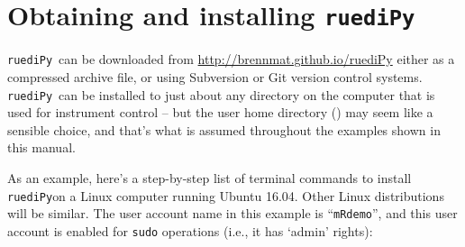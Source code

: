 \documentclass[12pt]{article}   	%
\newcommand{\ruediPy}{\texttt{ruediPy}}
\begin{document}
\section{Obtaining and installing \ruediPy}
\ruediPy\ can be downloaded from \url{http://brennmat.github.io/ruediPy} either as a compressed archive file, or using Subversion or Git version control systems. \ruediPy\ can be installed to just about any directory on the computer that is used for instrument control -- but the user home directory  () may seem like a sensible choice, and that's what is assumed throughout the examples shown in this manual.

As an example, here's a step-by-step list of terminal commands to install \ruediPy  on a Linux computer running Ubuntu 16.04. Other Linux distributions will be similar. The user account name in this example is ``\texttt{mRdemo}'', and this user account is enabled for \texttt{sudo} operations (i.e., it has `admin' rights):
\end{document}
